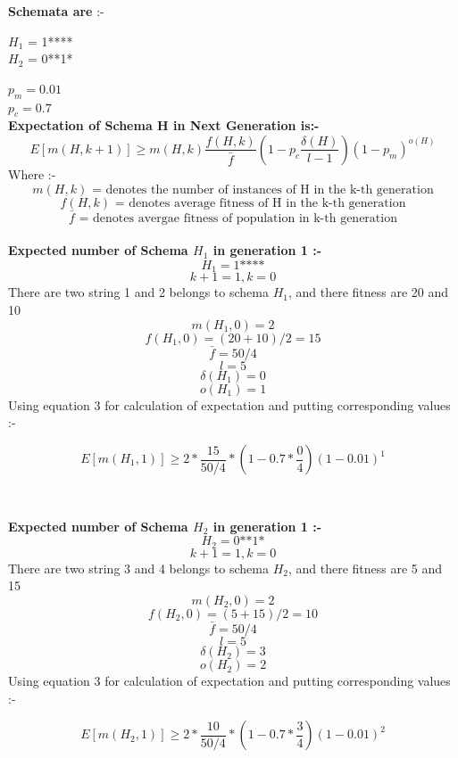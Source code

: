 \documentclass[12pt,letterpaper]{article}
\newcommand \order{o}
\begin{document}
\textbf{Schemata are} :- 
\begin{center}
    $H_1$ = 1****\\
    $H_2$ = 0**1*\\
\end{center}
$p_m = 0.01$\\
$p_c = 0.7$\\

\textbf{Expectation of Schema H in Next Generation is:-}
\begin{equation}
    E[m(H, k+1)] \geqslant m(H,k) \frac{f(H,k)}{\bar{f}} (1 - p_c \frac{\delta(H)}{l - 1}) (1 - p_m)^{\order(H)}
\end{equation}
Where :-
$$m(H,k)\text{ = denotes the number of instances of H in the k-th generation}$$
$$f(H,k)\text{ = denotes average fitness of H in the k-th generation}$$
$$\bar{f}\text{ = denotes avergae fitness of population in k-th generation}$$\\

\textbf{Expected number of Schema $H_1$ in generation 1 :-}\\
$$H_1 = \text{1****}$$
$$k+1 = 1, k = 0$$
There are two string 1 and 2 belongs to schema $H_1$, and there fitness are 20 and 10
$$m(H_1,0) = 2$$
$$f(H_1,0) = (20+10)/2 = 15$$
$$\bar{f} = 50/4$$
$$ l = 5$$
$$\delta(H_1) = 0$$
$$\order(H_1) = 1$$
Using equation 3 for calculation of expectation and putting corresponding values :-

$$ E[m(H_1,1)] \geqslant 2 * \frac{15}{50/4} * (1 - 0.7 * \frac{0}{4}) (1 - 0.01)^1$$


\begin{center}
\end{center}

\textbf{\\}

\textbf{Expected number of Schema $H_2$ in generation 1 :-}\\
$$H_2 = \text{0**1*}$$
$$k+1 = 1, k = 0$$
There are two string 3 and 4 belongs to schema $H_2$, and there fitness are 5 and 15
$$m(H_2,0) = 2$$
$$f(H_2,0) = (5+15)/2 = 10$$
$$\bar{f} = 50/4$$
$$ l = 5$$
$$\delta(H_2) = 3$$
$$\order(H_2) = 2$$
Using equation 3 for calculation of expectation and putting corresponding values :-

$$ E[m(H_2,1)] \geqslant 2 * \frac{10}{50/4} * (1 - 0.7 * \frac{3}{4}) (1 - 0.01)^2$$

\begin{center}
\end{center}
\end{document}
